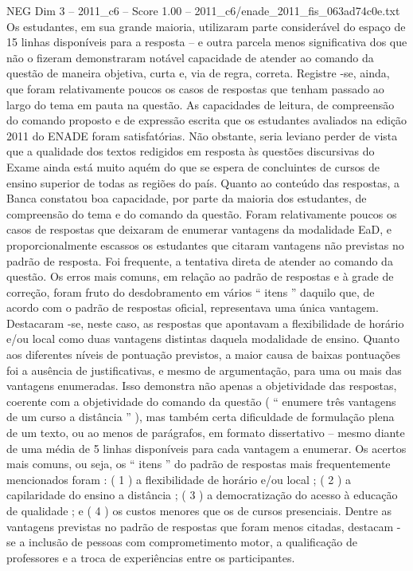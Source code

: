 \begin{textsample}{NEG Dim 3 – 2011\_c6 – Score 1.00 – 2011\_c6/enade\_2011\_fis\_063ad74c0e.txt}
Os estudantes, em sua grande maioria, utilizaram parte considerável do espaço de 15 linhas disponíveis para a resposta – e outra parcela menos significativa dos que não o fizeram demonstraram notável capacidade de atender ao comando da questão de maneira objetiva, curta e, via de regra, correta.
Registre -se, ainda, que foram relativamente poucos os casos de respostas que tenham passado ao largo do tema em pauta na questão.
As capacidades de leitura, de compreensão do comando proposto e de expressão escrita que os estudantes avaliados na edição 2011 do ENADE foram satisfatórias.
Não obstante, seria leviano perder de vista que a qualidade dos textos redigidos em resposta às questões discursivas do Exame ainda está muito aquém do que se espera de concluintes de cursos de ensino superior de todas as regiões do país.
Quanto ao conteúdo das respostas, a Banca constatou boa capacidade, por parte da maioria dos estudantes, de compreensão do tema e do comando da questão.
Foram relativamente poucos os casos de respostas que deixaram de enumerar vantagens da modalidade EaD, e proporcionalmente escassos os estudantes que citaram vantagens não previstas no padrão de resposta.
Foi frequente, a tentativa direta de atender ao comando da questão.
Os erros mais comuns, em relação ao padrão de respostas e à grade de correção, foram fruto do desdobramento em vários “ itens ” daquilo que, de acordo com o padrão de respostas oficial, representava uma única vantagem.
Destacaram -se, neste caso, as respostas que apontavam a flexibilidade de horário e/ou local como duas vantagens distintas daquela modalidade de ensino.
Quanto aos diferentes níveis de pontuação previstos, a maior causa de baixas pontuações foi a ausência de justificativas, e mesmo de argumentação, para uma ou mais das vantagens enumeradas.
Isso demonstra não apenas a objetividade das respostas, coerente com a objetividade do comando da questão ( “ enumere três vantagens de um curso a distância ” ), mas também certa dificuldade de formulação plena de um texto, ou ao menos de parágrafos, em formato dissertativo – mesmo diante de uma média de 5 linhas disponíveis para cada vantagem a enumerar.
Os acertos mais comuns, ou seja, os “ itens ” do padrão de respostas mais frequentemente mencionados foram : ( 1 ) a flexibilidade de horário e/ou local ; ( 2 ) a capilaridade do ensino a distância ; ( 3 ) a democratização do acesso à educação de qualidade ; e ( 4 ) os custos menores que os de cursos presenciais.
Dentre as vantagens previstas no padrão de respostas que foram menos citadas, destacam -se a inclusão de pessoas com comprometimento motor, a qualificação de professores e a troca de experiências entre os participantes.

\end{textsample}
